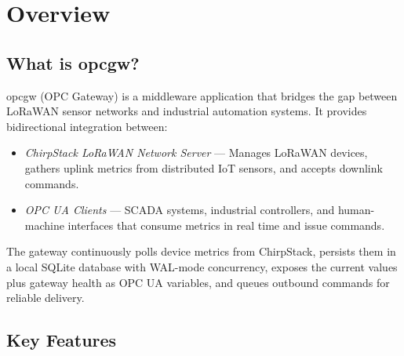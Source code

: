 \chapter{Overview}\label{ch-overview}

\section{What is opcgw?}\label{sec-what-is-opcgw}

opcgw (OPC Gateway) is a middleware application that bridges the gap between LoRaWAN sensor networks and industrial automation systems. It provides bidirectional integration between:

\begin{itemize}
\item
  \emph{ChirpStack LoRaWAN Network Server} --- Manages LoRaWAN devices, gathers uplink metrics from distributed IoT sensors, and accepts downlink commands.
\item
  \emph{OPC UA Clients} --- SCADA systems, industrial controllers, and human-machine interfaces that consume metrics in real time and issue commands.
\end{itemize}

The gateway continuously polls device metrics from ChirpStack, persists them in a local SQLite database with WAL-mode concurrency, exposes the current values plus gateway health as OPC UA variables, and queues outbound commands for reliable delivery.

\section{Key Features}\label{sec-key-features}

